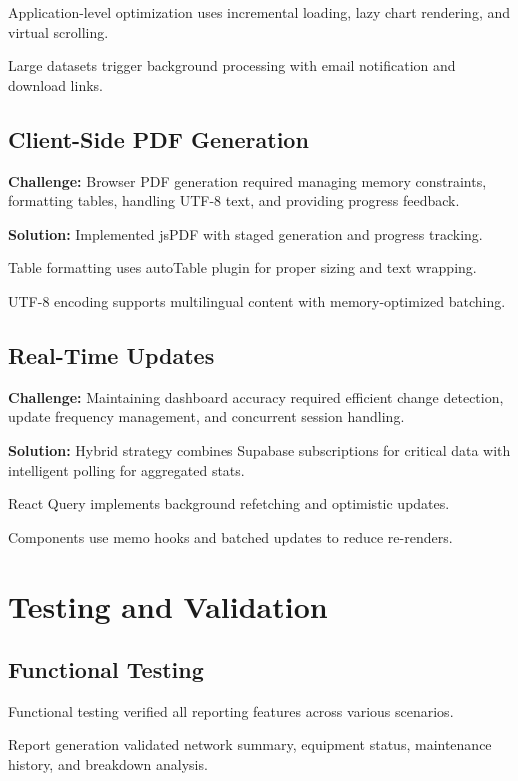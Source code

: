 Application-level optimization uses incremental loading, lazy chart rendering, and virtual scrolling.

Large datasets trigger background processing with email notification and download links.

\subsection{Client-Side PDF Generation}

\textbf{Challenge:} Browser PDF generation required managing memory constraints, formatting tables, handling UTF-8 text, and providing progress feedback.

\textbf{Solution:} Implemented jsPDF with staged generation and progress tracking.

Table formatting uses autoTable plugin for proper sizing and text wrapping.

UTF-8 encoding supports multilingual content with memory-optimized batching.

\subsection{Real-Time Updates}

\textbf{Challenge:} Maintaining dashboard accuracy required efficient change detection, update frequency management, and concurrent session handling.

\textbf{Solution:} Hybrid strategy combines Supabase subscriptions for critical data with intelligent polling for aggregated stats.

React Query implements background refetching and optimistic updates.

Components use memo hooks and batched updates to reduce re-renders.

\section{Testing and Validation}

\subsection{Functional Testing}

Functional testing verified all reporting features across various scenarios.

Report generation validated network summary, equipment status, maintenance history, and breakdown analysis.

